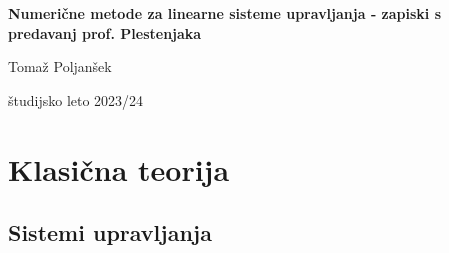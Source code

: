 \documentclass[a4paper, 12pt]{book}
\title{\ttitle}
\author{\tauthor}
\date{\tdate}
\newcommand{\ttitle}{Numerične metode za linearne sisteme upravljanja - zapiski s predavanj prof. Plestenjaka}
\newcommand{\tauthor}{Tomaž Poljanšek}
\newcommand{\tdate}{študijsko leto 2023/24}
\theoremstyle{definition}
\theoremstyle{remark}
\newcommand\mymaketitle{
  \begin{titlepage}
    \begin{center}
        \vspace*{4cm}
        \Huge
        \textbf{\ttitle}
                        
        \vspace{1.5cm}
        \huge
        \tauthor
            
        \vspace{3cm}
        \Large
        \tdate
    \end{center}
  \end{titlepage}
}
\begin{document}
\renewcommand{\thepage}{}
\newcommand{\sn}[1]{"`#1"'}

\mymaketitle

\clearpage

\frontmatter









\mainmatter
\setcounter{page}{1}
\pagestyle{fancy}





\chapter{Klasična teorija}


\section{Sistemi upravljanja}
\end{document}
